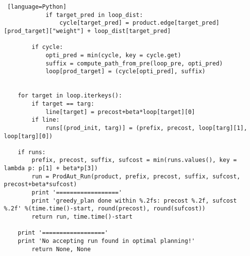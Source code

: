 \begin{lstlisting} [language=Python]
			if target_pred in loop_dist:
				cycle[target_pred] = product.edge[target_pred][prod_target]["weight"] + loop_dist[target_pred]
				
		if cycle:
			opti_pred = min(cycle, key = cycle.get)
			suffix = compute_path_from_pre(loop_pre, opti_pred)
			loop[prod_target] = (cycle[opti_pred], suffix)


	for target in loop.iterkeys():
		if target == targ:
			line[target] = precost+beta*loop[target][0]
		if line:
			runs[(prod_init, targ)] = (prefix, precost, loop[targ][1], loop[targ][0])

	if runs:
		prefix, precost, suffix, sufcost = min(runs.values(), key = lambda p: p[1] + beta*p[3])
		run = ProdAut_Run(product, prefix, precost, suffix, sufcost, precost+beta*sufcost)
		print '=================='
		print 'greedy_plan done within %.2fs: precost %.2f, sufcost %.2f' %(time.time()-start, round(precost), round(sufcost))
		return run, time.time()-start

	print '=================='        
	print 'No accepting run found in optimal planning!'
        return None, None
\end{lstlisting}




